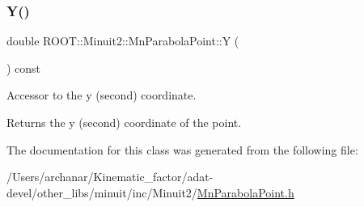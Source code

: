 \subsubsection{\texorpdfstring{Y()}{Y()}\hspace{0.1cm}{\footnotesize\ttfamily [3/3]}}
{\footnotesize\ttfamily double R\+O\+O\+T\+::\+Minuit2\+::\+Mn\+Parabola\+Point\+::Y (\begin{DoxyParamCaption}{ }\end{DoxyParamCaption}) const\hspace{0.3cm}{\ttfamily [inline]}}

Accessor to the y (second) coordinate.

\begin{DoxyReturn}{Returns}
the y (second) coordinate of the point. 
\end{DoxyReturn}


The documentation for this class was generated from the following file\+:\begin{DoxyCompactItemize}
\item 
/\+Users/archanar/\+Kinematic\+\_\+factor/adat-\/devel/other\+\_\+libs/minuit/inc/\+Minuit2/\mbox{\hyperlink{adat-devel_2other__libs_2minuit_2inc_2Minuit2_2MnParabolaPoint_8h}{Mn\+Parabola\+Point.\+h}}\end{DoxyCompactItemize}
